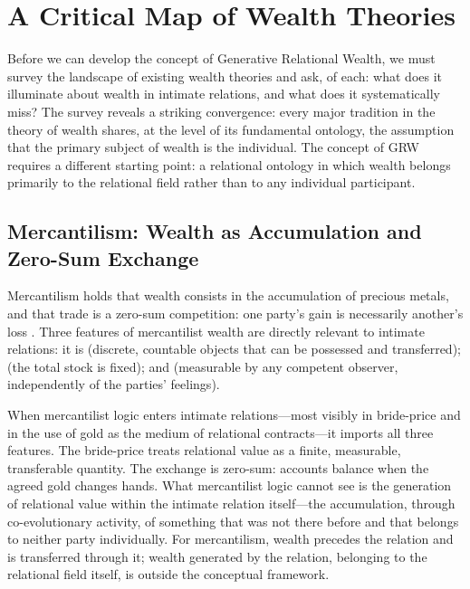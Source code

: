 \section{A Critical Map of Wealth Theories}
\label{p15:sec:wealth_theories}

\noindent
Before we can develop the concept of Generative Relational Wealth, we must survey the landscape of existing wealth theories and ask, of each: what does it illuminate about wealth in intimate relations, and what does it systematically miss? The survey reveals a striking convergence: every major tradition in the theory of wealth shares, at the level of its fundamental ontology, the assumption that the primary subject of wealth is the individual. The concept of GRW requires a different starting point: a relational ontology in which wealth belongs primarily to the relational field rather than to any individual participant.

\subsection{Mercantilism: Wealth as Accumulation and Zero-Sum Exchange}
\label{p15:subsec:mercantilism}

\noindent
Mercantilism holds that wealth consists in the accumulation of precious metals, and that trade is a zero-sum competition: one party's gain is necessarily another's loss \parencite{marx1976}. Three features of mercantilist wealth are directly relevant to intimate relations: it is  (discrete, countable objects that can be possessed and transferred);  (the total stock is fixed); and  (measurable by any competent observer, independently of the parties' feelings).

When mercantilist logic enters intimate relations---most visibly in bride-price and in the use of gold as the medium of relational contracts---it imports all three features. The bride-price treats relational value as a finite, measurable, transferable quantity. The exchange is zero-sum: accounts balance when the agreed gold changes hands. What mercantilist logic cannot see is the generation of relational value within the intimate relation itself---the accumulation, through co-evolutionary activity, of something that was not there before and that belongs to neither party individually. For mercantilism, wealth precedes the relation and is transferred through it; wealth generated by the relation, belonging to the relational field itself, is outside the conceptual framework.

